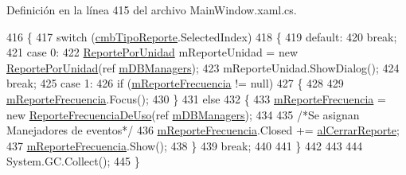 Definición en la línea 415 del archivo Main\-Window.\-xaml.\-cs.


\begin{DoxyCode}
416         \{
417             \textcolor{keywordflow}{switch} (\hyperlink{class_proyecto___integrador__3_1_1_main_window_af005273fce43d170b199a3f487ab24cf}{cmbTipoReporte}.SelectedIndex)
418             \{
419                 \textcolor{keywordflow}{default}:
420                     \textcolor{keywordflow}{break};
421                 \textcolor{keywordflow}{case} 0:
422                     \hyperlink{class_proyecto___integrador__3_1_1_reportes_1_1_reporte_por_unidad}{ReportePorUnidad} mReporteUnidad = \textcolor{keyword}{new} 
      \hyperlink{class_proyecto___integrador__3_1_1_reportes_1_1_reporte_por_unidad}{ReportePorUnidad}(ref \hyperlink{class_proyecto___integrador__3_1_1_main_window_ad2b88cf68cee145343b2da734c94d8d5}{mDBManagers});
423                     mReporteUnidad.ShowDialog();
424                     \textcolor{keywordflow}{break};
425                 \textcolor{keywordflow}{case} 1:
426                     \textcolor{keywordflow}{if} (\hyperlink{class_proyecto___integrador__3_1_1_main_window_a6543f720f5d77939f0cc967765351416}{mReporteFrecuencia} != null)
427                     \{
428                         
429                         \hyperlink{class_proyecto___integrador__3_1_1_main_window_a6543f720f5d77939f0cc967765351416}{mReporteFrecuencia}.Focus();
430                     \}
431                     \textcolor{keywordflow}{else}
432                     \{
433                         \hyperlink{class_proyecto___integrador__3_1_1_main_window_a6543f720f5d77939f0cc967765351416}{mReporteFrecuencia} = \textcolor{keyword}{new} 
      \hyperlink{class_proyecto___integrador__3_1_1_reportes_1_1_reporte_frecuencia_de_uso}{ReporteFrecuenciaDeUso}(ref \hyperlink{class_proyecto___integrador__3_1_1_main_window_ad2b88cf68cee145343b2da734c94d8d5}{mDBManagers});
434 
435                         \textcolor{comment}{/*Se asignan Manejadores de eventos*/}
436                         \hyperlink{class_proyecto___integrador__3_1_1_main_window_a6543f720f5d77939f0cc967765351416}{mReporteFrecuencia}.Closed += 
      \hyperlink{class_proyecto___integrador__3_1_1_main_window_a49f98bf3443dff4b67a632a88876c5ea}{alCerrarReporte};
437                         \hyperlink{class_proyecto___integrador__3_1_1_main_window_a6543f720f5d77939f0cc967765351416}{mReporteFrecuencia}.Show();
438                     \}
439                     \textcolor{keywordflow}{break};
440 
441             \}
442             
443             
444             System.GC.Collect();
445         \}
\end{DoxyCode}
